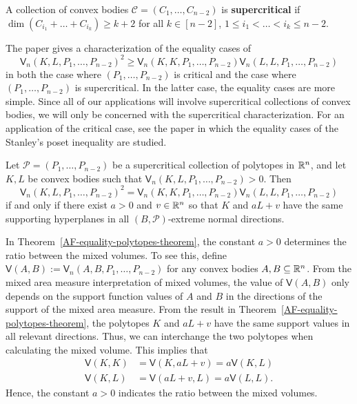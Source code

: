 \documentclass{puthesis-UG}
\begin{document}
\begin{defn}
	A collection of convex bodies $\mathcal{C} = (C_1, \ldots, C_{n-2})$ is \textbf{supercritical} if $\dim (C_{i_1} + \ldots + C_{i_k}) \geq k+2$ for all $k \in [n-2]$, $1 \leq i_1 < \ldots < i_k \leq n-2$. 
\end{defn} 

The paper \cite{shenfeld2022extremals} gives a characterization of the equality cases of 
\[
	\mathsf{V}_n(K, L, P_1, \ldots, P_{n-2})^2 \geq \mathsf{V}_n (K, K, P_1, \ldots, P_{n-2}) \mathsf{V}_n (L, L, P_1, \ldots, P_{n-2})
\]
in both the case where $(P_1, \ldots, P_{n-2})$ is critical and the case where $(P_1, \ldots, P_{n-2})$ is supercritical. In the latter case, the equality cases are more simple. Since all of our applications will involve supercritical collections of convex bodies, we will only be concerned with the supercritical characterization. For an application of the critical case, see the paper \cite{ma2022extremals} in which the equality cases of the Stanley's poset inequality are studied.
	
\begin{thm} \label{AF-equality-polytopes-theorem}
	Let $\mathcal{P} = (P_1, \ldots, P_{n-2})$ be a supercritical collection of polytopes in $\mathbb{R}^n$, and let $K, L$ be convex bodies such that $\mathsf{V}_n (K, L, P_1, \ldots, P_{n-2}) > 0$. Then 
	\[
		\mathsf{V}_n (K, L, P_1, \ldots, P_{n-2})^2 = \mathsf{V}_n (K, K, P_1, \ldots, P_{n-2}) \mathsf{V}_n (L, L, P_1, \ldots, P_{n-2})
	\]
	if and only if there exist $a > 0$ and $v \in \mathbb{R}^n$ so that $K$ and $a L + v$ have the same supporting hyperplanes in all $(B, \mathcal{P})$-extreme normal directions.
\end{thm}

In Theorem~\ref{AF-equality-polytopes-theorem}, the constant $a > 0$ determines the ratio between the mixed volumes. To see this, define $\mathsf{V} (A, B) := \mathsf{V}_n(A, B, P_1, \ldots, P_{n-2})$ for any convex bodies $A, B \subseteq \mathbb{R}^n$. From the mixed area measure interpretation of mixed volumes, the value of $\mathsf{V}(A, B)$ only depends on the support function values of $A$ and $B$ in the directions of the support of the mixed area measure. From the result in Theorem~\ref{AF-equality-polytopes-theorem}, the polytopes $K$ and $aL+v$ have the same support values in all relevant directions. Thus, we can interchange the two polytopes when calculating the mixed volume. This implies that
\begin{align*}
	\mathsf{V}(K, K) & = \mathsf{V}(K, aL + v) = a \mathsf{V}(K, L) \\
	\mathsf{V}(K, L) & = \mathsf{V}(aL+v, L) = a \mathsf{V} (L, L).
\end{align*}
Hence, the constant $a > 0$ indicates the ratio between the mixed volumes. 
\end{document}
